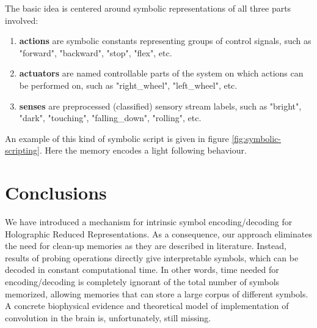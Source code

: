 \documentclass[conference]{IEEEtran}
\begin{document}
The basic idea is centered around symbolic representations of all three parts involved:
\begin{enumerate}
	\item \textbf{actions} are symbolic constants representing groups of control signals, such as "forward", "backward", "stop", "flex", etc.
	
	\item \textbf{actuators} are named controllable parts of the system on which actions can be performed on, such as "right\_wheel", "left\_wheel", etc.
	
	\item \textbf{senses} are preprocessed (classified) sensory stream labels, such as "bright", "dark", "touching", "falling\_down", "rolling", etc.
\end{enumerate}

An example of this kind of symbolic script is given in figure \ref{fig:symbolic-scripting}. Here the memory encodes a light following behaviour.

	\section{Conclusions}
	We have introduced a mechanism for intrinsic symbol encoding/decoding for Holographic Reduced Representations.
As a consequence, our approach eliminates the need for clean-up memories as they are described in literature.
Instead, results of probing operations directly give interpretable symbols, which can be decoded in constant computational time.
In other words, time needed for encoding/decoding is completely ignorant of the total number of symbols memorized, allowing memories that can store a large corpus of different symbols.
	A concrete biophysical evidence and theoretical model of implementation of convolution in the brain is, unfortunately, still missing.
	
	\printbibliography[heading=bibintoc]
	
\end{document}
